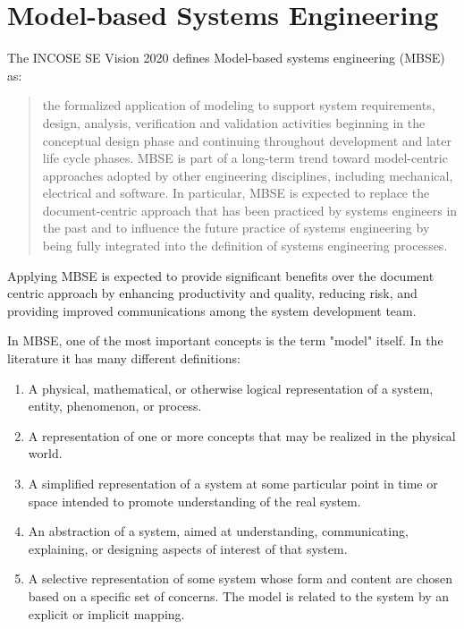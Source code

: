 \section{Model-based Systems Engineering}\label{sec:mbse}

The INCOSE SE Vision 2020\cite{incose-systems-engineering-2020} defines Model-based systems engineering (MBSE) as:

\blockquote{the formalized application of modeling to support system requirements, design, analysis, verification and validation activities beginning in the conceptual design phase and continuing throughout development and later life cycle phases. MBSE is part of a long-term trend toward model-centric approaches adopted by other engineering disciplines, including mechanical, electrical and software. In particular, MBSE is expected to replace the document-centric approach that has been practiced by systems engineers in the past and to influence the future practice of systems engineering by being fully integrated into the definition of systems engineering processes.}

Applying MBSE is expected to provide significant benefits over the document centric approach by enhancing productivity and quality, reducing risk, and providing improved communications among the system development team.\cite{omgwiki}

In MBSE, one of the most important concepts is the term "model" itself. In the literature it has many different definitions:

\begin{enumerate}
	\item A physical, mathematical, or otherwise logical representation of a system, entity, phenomenon, or process.\cite{DoD_modeling_and_simulation}\label{item:dod}
	\item A representation of one or more concepts that may be realized in the physical world.\cite{sysml_practical_guide}
	\item A simplified representation of a system at some particular point in time or space intended to promote understanding of the real system.\cite{modsim}
	\item An abstraction of a system, aimed at understanding, communicating, explaining, or designing aspects of interest of that system.\cite{object-process-methodology}
	\item A selective representation of some system whose form and content are chosen based on a specific set of concerns. The model is related to the system by an explicit or implicit mapping.\cite{ORMSC/2010-09-06}
\end{enumerate}

